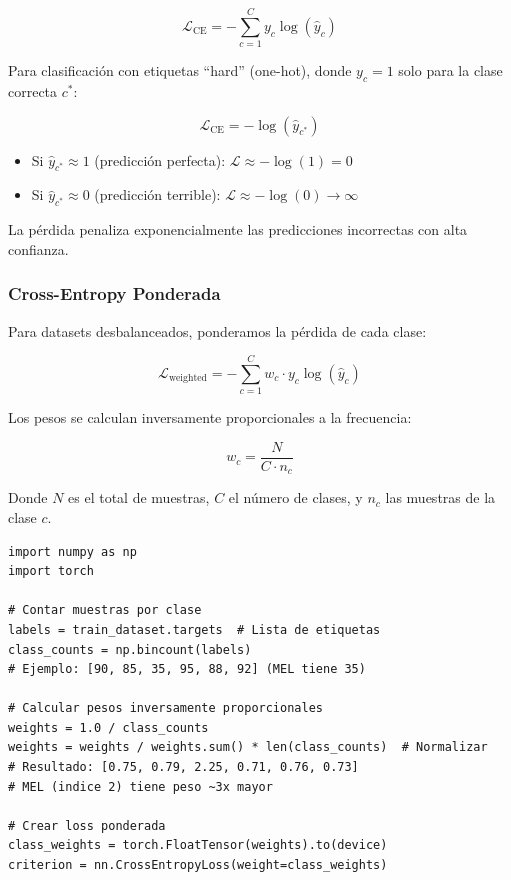 \documentclass[12pt,a4paper]{article}
\begin{document}
\begin{equation}
\mathcal{L}_{\text{CE}} = -\sum_{c=1}^{C} y_c \log(\hat{y}_c)
\end{equation}

Para clasificación con etiquetas ``hard'' (one-hot), donde $y_c = 1$ solo para la clase correcta $c^*$:

\begin{equation}
\mathcal{L}_{\text{CE}} = -\log(\hat{y}_{c^*})
\end{equation}

\begin{mathbox}
\begin{itemize}
    \item Si $\hat{y}_{c^*} \approx 1$ (predicción perfecta): $\mathcal{L} \approx -\log(1) = 0$
    \item Si $\hat{y}_{c^*} \approx 0$ (predicción terrible): $\mathcal{L} \approx -\log(0) \rightarrow \infty$
\end{itemize}
La pérdida penaliza exponencialmente las predicciones incorrectas con alta confianza.
\end{mathbox}

\subsubsection{Cross-Entropy Ponderada}

Para datasets desbalanceados, ponderamos la pérdida de cada clase:

\begin{equation}
\mathcal{L}_{\text{weighted}} = -\sum_{c=1}^{C} w_c \cdot y_c \log(\hat{y}_c)
\end{equation}

Los pesos se calculan inversamente proporcionales a la frecuencia:

\begin{equation}
w_c = \frac{N}{C \cdot n_c}
\end{equation}

Donde $N$ es el total de muestras, $C$ el número de clases, y $n_c$ las muestras de la clase $c$.

\begin{lstlisting}[caption={Cálculo de pesos de clase en Python}]
import numpy as np
import torch

# Contar muestras por clase
labels = train_dataset.targets  # Lista de etiquetas
class_counts = np.bincount(labels)
# Ejemplo: [90, 85, 35, 95, 88, 92] (MEL tiene 35)

# Calcular pesos inversamente proporcionales
weights = 1.0 / class_counts
weights = weights / weights.sum() * len(class_counts)  # Normalizar
# Resultado: [0.75, 0.79, 2.25, 0.71, 0.76, 0.73]
# MEL (indice 2) tiene peso ~3x mayor

# Crear loss ponderada
class_weights = torch.FloatTensor(weights).to(device)
criterion = nn.CrossEntropyLoss(weight=class_weights)
\end{lstlisting}
\end{document}
